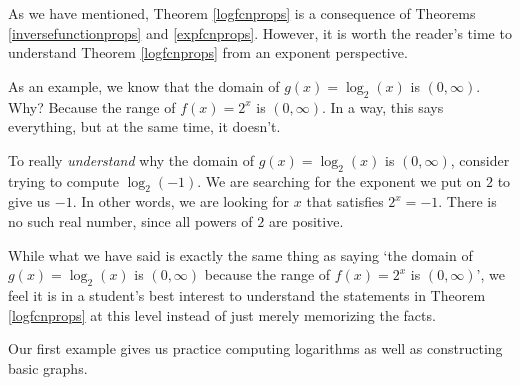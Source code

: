 \documentclass{ximera}
\begin{document}
As we have mentioned, Theorem \ref{logfcnprops} is a consequence of Theorems \ref{inversefunctionprops} and \ref{expfcnprops}.  However, it is worth the reader's time to understand Theorem \ref{logfcnprops} from an exponent perspective.  


\smallskip

As an example, we know that the domain of $g(x) = \log_{2}(x)$ is $(0,\infty)$.  Why?  Because the range of $f(x) = 2^{x}$ is $(0,\infty)$.  In a way, this says everything, but at the same time, it doesn't. 

\smallskip

To really \textit{understand} why the domain of $g(x) = \log_{2}(x)$ is $(0,\infty)$,  consider trying to compute $\log_{2}(-1)$.   We are searching for the exponent we put on $2$ to give us $-1$.  In other words, we are looking for $x$ that satisfies $2^{x} = -1$.  There is no such real number, since all powers of $2$ are positive. 

\smallskip

 While what we have said is exactly the same thing as saying `the domain of $g(x) = \log_{2}(x)$ is $(0,\infty)$ because the range of $f(x) = 2^{x}$ is $(0,\infty)$', we feel it is in a student's best interest to understand the statements in Theorem \ref{logfcnprops} at this level instead of just merely memorizing the facts.
 
\smallskip
 
 Our first example gives us practice computing logarithms as well as constructing basic graphs.
 
\newpage
\end{document}
